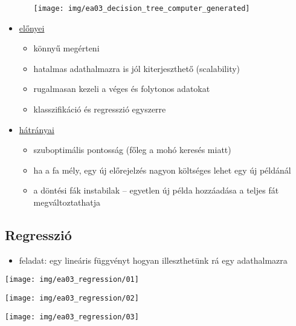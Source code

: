 \documentclass[a4paper, 11pt]{article}
\begin{document}
\begin{itemize}
\begin{itemize}
		\begin{center}
			\texttt{[image: img/ea03\_decision\_tree\_computer\_generated]}
		\end{center}
	\end{itemize}
	\item \underline{előnyei}
	\begin{itemize}
		\item könnyű megérteni
		\item hatalmas adathalmazra is jól kiterjeszthető (scalability)
		\item rugalmasan kezeli a véges és folytonos adatokat
		\item klasszifikáció és regresszió egyszerre
	\end{itemize}
	\item \underline{hátrányai}
	\begin{itemize}
		\item szuboptimális pontosság (főleg a mohó keresés miatt)
		\item ha a fa mély, egy új előrejelzés nagyon költséges lehet egy új példánál
		\item a döntési fák instabilak -- egyetlen új példa hozzáadása a teljes fát megváltoztathatja
	\end{itemize}
\end{itemize}

\subsection{Regresszió}

\begin{itemize}
	\item feladat: egy lineáris függvényt hogyan illeszthetünk rá egy adathalmazra
\end{itemize}

\begin{minipage}{0.33\linewidth}
	\begin{center}
		\texttt{[image: img/ea03\_regression/01]}
	\end{center}
\end{minipage}
\begin{minipage}{0.33\linewidth}
	\begin{center}
		\texttt{[image: img/ea03\_regression/02]}
	\end{center}
\end{minipage}
\begin{minipage}{0.33\linewidth}
	\begin{center}
		\texttt{[image: img/ea03\_regression/03]}
	\end{center}
\end{minipage}
\end{document}
